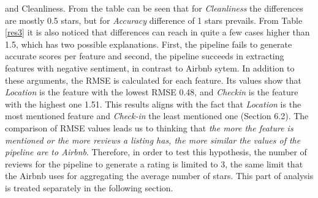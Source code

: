 and Cleanliness. From the table can be seen that for \textit{Cleanliness} the differences are mostly 0.5 stars, but for \textit{Accuracy} difference of 1 stars prevails. From Table \ref{res3} it is also noticed that differences can reach in quite a few cases higher than 1.5, which has two possible explanations. First, the pipeline fails to generate accurate scores per feature and second, the pipeline succeeds in extracting features with negative sentiment, in contrast to Airbnb sytem. In addition to these arguments, the RMSE is calculated for each feature. Its values show that \textit{Location} is the feature with the lowest RMSE 0.48, and \textit{Checkin} is the feature with the highest one 1.51. This results aligns with the fact that \textit{Location} is the most mentioned feature and \textit{Check-in} the least mentioned one (Section 6.2). The comparison of RMSE values leads us to thinking that \textit{the more the feature is mentioned or the more reviews a listing has, the more similar the values of the pipeline are to Airbnb}. Therefore, in order to test this hypothesis, the  number of reviews for the pipeline to generate a rating is limited to 3, the same limit that the Airbnb uses for aggregating the average number of stars. This part of analysis is treated separately in the following section.
